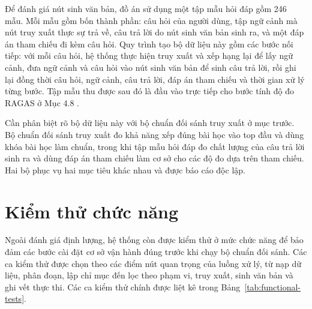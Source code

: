 \documentclass[../DoAn.tex]{subfiles}
\begin{document}
Để đánh giá nút sinh văn bản, đồ án sử dụng một tập mẫu hỏi đáp gồm 246 mẫu. Mỗi mẫu gồm bốn thành phần: câu hỏi của người dùng, tập ngữ cảnh mà nút truy xuất thực sự trả về, câu trả lời do nút sinh văn bản sinh ra, và một đáp án tham chiếu đi kèm câu hỏi. Quy trình tạo bộ dữ liệu này gồm các bước nối tiếp: với mỗi câu hỏi, hệ thống thực hiện truy xuất và xếp hạng lại để lấy ngữ cảnh, đưa ngữ cảnh và câu hỏi vào nút sinh văn bản để sinh câu trả lời, rồi ghi lại đồng thời câu hỏi, ngữ cảnh, câu trả lời, đáp án tham chiếu và thời gian xử lý từng bước. Tập mẫu thu được sau đó là đầu vào trực tiếp cho bước tính độ đo RAGAS ở Mục 4.8 \cite{es2023ragas}.

Cần phân biệt rõ bộ dữ liệu này với bộ chuẩn đối sánh truy xuất ở mục trước. Bộ chuẩn đối sánh truy xuất đo khả năng xếp đúng bài học vào top đầu và dùng khóa bài học làm chuẩn, trong khi tập mẫu hỏi đáp đo chất lượng của câu trả lời sinh ra và dùng đáp án tham chiếu làm cơ sở cho các độ đo dựa trên tham chiếu. Hai bộ phục vụ hai mục tiêu khác nhau và được báo cáo độc lập.

\section{Kiểm thử chức năng}

Ngoài đánh giá định lượng, hệ thống còn được kiểm thử ở mức chức năng để bảo đảm các bước cài đặt cơ sở vận hành đúng trước khi chạy bộ chuẩn đối sánh. Các ca kiểm thử được chọn theo các điểm nút quan trọng của luồng xử lý, từ nạp dữ liệu, phân đoạn, lập chỉ mục đến lọc theo phạm vi, truy xuất, sinh văn bản và ghi vết thực thi. Các ca kiểm thử chính được liệt kê trong Bảng~\ref{tab:functional-tests}.
\end{document}
